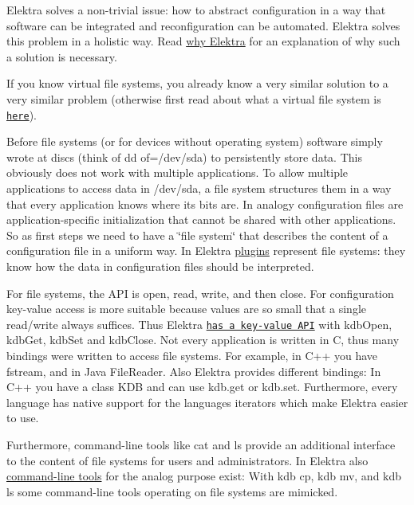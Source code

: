 Elektra solves a non-\/trivial issue\+: how to abstract configuration in a way that software can be integrated and reconfiguration can be automated. Elektra solves this problem in a holistic way. Read \hyperlink{doc_WHY_md}{why Elektra} for an explanation of why such a solution is necessary.

If you know virtual file systems, you already know a very similar solution to a very similar problem (otherwise first read about what a virtual file system is \href{https://en.wikipedia.org/wiki/Virtual_file_system}{\tt here}).

Before file systems (or for devices without operating system) software simply wrote at discs (think of {\ttfamily dd of=/dev/sda}) to persistently store data. This obviously does not work with multiple applications. To allow multiple applications to access data in {\ttfamily /dev/sda}, a file system structures them in a way that every application knows where its bits are. In analogy configuration files are application-\/specific initialization that cannot be shared with other applications. So as first steps we need to have a \char`\"{}file system\char`\"{} that describes the content of a configuration file in a uniform way. In Elektra \hyperlink{src_plugins_README_md}{plugins} represent file systems\+: they know how the data in configuration files should be interpreted.

For file systems, the A\+PI is {\ttfamily open}, {\ttfamily read}, {\ttfamily write}, and then {\ttfamily close}. For configuration key-\/value access is more suitable because values are so small that a single read/write always suffices. Thus Elektra \href{https://doc.libelektra.org/api/latest/html}{\tt has a key-\/value A\+PI} with {\ttfamily kdb\+Open}, {\ttfamily kdb\+Get}, {\ttfamily kdb\+Set} and {\ttfamily kdb\+Close}. Not every application is written in C, thus many {\ttfamily bindings} were written to access file systems. For example, in C++ you have {\ttfamily fstream}, and in Java {\ttfamily File\+Reader}. Also Elektra provides different bindings\+: In C++ you have a class {\ttfamily K\+DB} and can use {\ttfamily kdb.\+get} or {\ttfamily kdb.\+set}. Furthermore, every language has native support for the language\textquotesingle{}s iterators which make Elektra easier to use.

Furthermore, command-\/line tools like {\ttfamily cat} and {\ttfamily ls} provide an additional interface to the content of file systems for users and administrators. In Elektra also \hyperlink{doc_help_kdb_md}{command-\/line tools} for the analog purpose exist\+: With {\ttfamily kdb cp}, {\ttfamily kdb mv}, and {\ttfamily kdb ls} some command-\/line tools operating on file systems are mimicked.

